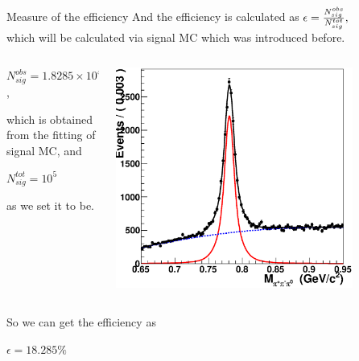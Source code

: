 \documentclass{beamer}
\begin{document}
\begin{frame}{Measure of the efficiency \epsilon}
 And the efficiency is calculated as\;  $\epsilon={N^{obs}_{sig}\over N^{tot}_{sig}},$\\
 which will be calculated via signal MC which was introduced before.\\
		\begin{columns}
		\begin{column}{0.4\textwidth}
		\begin{center}
 $N^{obs}_{sig}=1.8285\times 10^4$,
 \end{center}
 which is obtained from the fitting of signal MC, and\\
	  \begin{center}
	  $N^{tot}_{sig}=10^5$\\
	\end{center}
	as we set it to be.
\end{column}
   \begin{column}{0.5\textwidth}
   \includegraphics[width=0.8\textwidth]{graphics/signal.eps}
 \end{column}
   \end{columns}
So we can get the efficiency as\\
	   \begin{center}
   $\epsilon=18.285\%$
   \end{center}
\end{frame}
\end{document}
